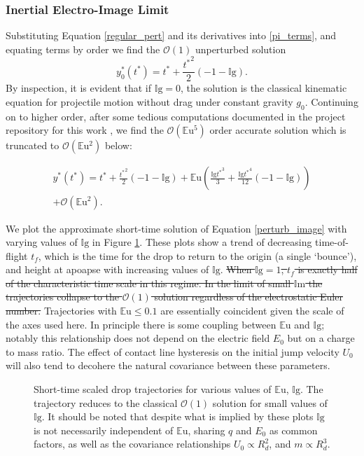 \documentclass[aip,reprint, floatfix]{revtex4-1}
\begin{document}
\subsubsection{Inertial Electro-Image Limit}
Substituting Equation \ref{regular_pert} and its derivatives into \ref{pi_terms}, and equating terms by order we find the $\mathcal{O}(1)$ unperturbed solution
\[{y^*_{0}}{\left ({t^*} \right )} = {t^*} + \frac{{t^*}^{2}}{2} \left(-1 - \mathbb{I}\mbox{g}\right). \]
By inspection, it is evident that if $\mathbb{I}\mbox{g}=0$, the solution is the classical kinematic equation for projectile motion without drag under constant gravity $g_0$. Continuing on to higher order, after some tedious computations documented in the project repository for this work \cite{schmidt_droplet_electro-bounce:_2017}, we find the $\mathcal{O}(\mathbb{E}\mbox{u}^5)$ order accurate solution which is truncated to $\mathcal{O}(\mathbb{E}\mbox{u}^2)$ below:

\begin{gather}
{y^*}({t^*}) = {t^*} + \frac{{t^*}^{2}}{2} \left(-1 - \mathbb{I}\mbox{g}\right)
 + \mathbb{E}\mbox{u} \left(\frac{\mathbb{I}\mbox{g} {t^*}^{3}}{3} + \frac{\mathbb{I}\mbox{g} {t^*}^{4}}{12} \left(-1 - \mathbb{I}\mbox{g} \right)\right) \nonumber \\
 + \mathcal{O}(\mathbb{E}\mbox{u}^2). \label{perturb_image}
\end{gather}

We plot the approximate short-time solution of Equation \ref{perturb_image} with varying values of $\mathbb{I}\mbox{g}$ in Figure \ref{fig:short_times}. These plots show a trend of decreasing time-of-flight $t_f$, which is the time for the drop to return to the origin (a single `bounce'), and height at apoapse with increasing values of $\mathbb{I}\mbox{g}$. \sout{When $\mathbb{I}\mbox{g} = 1$, $t_f$ is exactly half of the characteristic time scale in this regime. In the limit of small $\mathbb{I}\mbox{m}$ the trajectories collapse to the $\mathcal{O}(1)$ solution regardless of the electrostatic Euler number.} Trajectories with $\mathbb{E}\mbox{u} \leq 0.1$ are essentially coincident given the scale of the axes used here. In principle there is some coupling between $\mathbb{E}\mbox{u}$ and $\mathbb{I}\mbox{g}$; notably this relationship does not depend on the electric field $E_0$ but on a charge to mass ratio. The effect of contact line hysteresis on the initial jump velocity $U_0$ will also tend to decohere the natural covariance between these parameters.

\begin{figure}[htp]
    \resizebox{0.8\textwidth}{!}{}
    \caption{Short-time scaled drop trajectories for various values of $\mathbb{E}\mbox{u}$, $\mathbb{I}\mbox{g}$. The trajectory reduces to the classical $\mathcal{O}(1)$ solution for small values of $\mathbb{I}\mbox{g}$. It should be noted that despite what is implied by these plots $\mathbb{I}\mbox{g}$ is not necessarily independent of $\mathbb{E}\mbox{u}$, sharing $q$ and $E_0$ as common factors, as well as the covariance relationships $U_0 \propto R_d^2$, and $m \propto R_d^3$.}
    \label{fig:short_times}
\end{figure}
\end{document}
